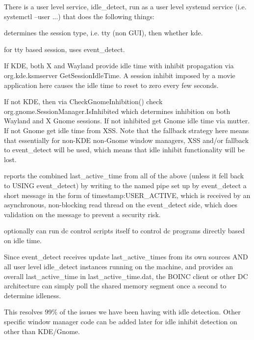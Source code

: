 \begin{DoxyEnumerate}
\item There is a user level service, idle\+\_\+detect, run as a user level systemd service (i.\+e. systemctl --user ...) that does the following things\+:
\begin{DoxyItemize}
\item determines the session type, i.\+e. tty (non G\+UI), then whether kde.
\item for tty based session, uses event\+\_\+detect.
\item If K\+DE, both X and Wayland provide idle time with inhibit propagation via org.\+kde.\+ksmserver Get\+Session\+Idle\+Time. A session inhibit imposed by a movie application here causes the idle time to reset to zero every few seconds.
\item If not K\+DE, then via Check\+Gnome\+Inhibition() check org.\+gnome.\+Session\+Manager.\+Is\+Inhibited which determines inhibition on both Wayland and X Gnome sessions. If not inhibited get Gnome idle time via mutter. If not Gnome get idle time from X\+SS. Note that the fallback strategy here means that essentially for non-\/\+K\+DE non-\/\+Gnome window managers, X\+SS and/or fallback to event\+\_\+detect will be used, which means that idle inhibit functionality will be lost.
\item reports the combined last\+\_\+active\+\_\+time from all of the above (unless it fell back to U\+S\+I\+NG event\+\_\+detect) by writing to the named pipe set up by event\+\_\+detect a short message in the form of timestamp\+:U\+S\+E\+R\+\_\+\+A\+C\+T\+I\+VE, which is received by an asynchronous, non-\/blocking read thread on the event\+\_\+detect side, which does validation on the message to prevent a security risk.
\item optionally can run dc control scripts itself to control dc programs directly based on idle time.
\end{DoxyItemize}
\end{DoxyEnumerate}

Since event\+\_\+detect receives update last\+\_\+active\+\_\+times from its own sources A\+ND all user level idle\+\_\+detect instances running on the machine, and provides an overall last\+\_\+active\+\_\+time in last\+\_\+active\+\_\+time.\+dat, the B\+O\+I\+NC client or other DC architecture can simply poll the shared memory segment once a second to determine idleness.

This resolves 99\% of the issues we have been having with idle detection. Other specific window manager code can be added later for idle inhibit detection on other than K\+D\+E/\+Gnome.

